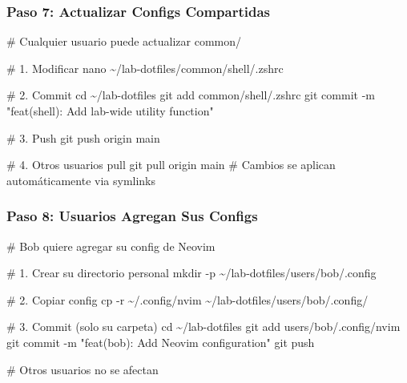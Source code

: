 \documentclass[
  doc,
  floatsintext,
  longtable,
  a4paper,
  nolmodern,
  notxfonts,
  notimes,
  12pt,
  colorlinks=true,linkcolor=blue,citecolor=blue,urlcolor=blue]{apa7}
\newenvironment{Shaded}{\begin{snugshade}}{\end{snugshade}}
\newcommand{\AttributeTok}[1]{\textcolor[rgb]{0.40,0.45,0.13}{#1}}
\newcommand{\BuiltInTok}[1]{\textcolor[rgb]{0.00,0.23,0.31}{#1}}
\newcommand{\CommentTok}[1]{\textcolor[rgb]{0.37,0.37,0.37}{#1}}
\newcommand{\FunctionTok}[1]{\textcolor[rgb]{0.28,0.35,0.67}{#1}}
\newcommand{\NormalTok}[1]{\textcolor[rgb]{0.00,0.23,0.31}{#1}}
\newcommand{\StringTok}[1]{\textcolor[rgb]{0.13,0.47,0.30}{#1}}
\begin{document}
\subsubsection{Paso 7: Actualizar Configs
Compartidas}\label{paso-7-actualizar-configs-compartidas}

\begin{Shaded}
\begin{Highlighting}[]
\CommentTok{\# Cualquier usuario puede actualizar common/}

\CommentTok{\# 1. Modificar}
\FunctionTok{nano}\NormalTok{ \textasciitilde{}/lab{-}dotfiles/common/shell/.zshrc}

\CommentTok{\# 2. Commit}
\BuiltInTok{cd}\NormalTok{ \textasciitilde{}/lab{-}dotfiles}
\FunctionTok{git}\NormalTok{ add common/shell/.zshrc}
\FunctionTok{git}\NormalTok{ commit }\AttributeTok{{-}m} \StringTok{"feat(shell): Add lab{-}wide utility function"}

\CommentTok{\# 3. Push}
\FunctionTok{git}\NormalTok{ push origin main}

\CommentTok{\# 4. Otros usuarios pull}
\FunctionTok{git}\NormalTok{ pull origin main}
\CommentTok{\# Cambios se aplican automáticamente via symlinks}
\end{Highlighting}
\end{Shaded}

\subsubsection{Paso 8: Usuarios Agregan Sus
Configs}\label{paso-8-usuarios-agregan-sus-configs}

\begin{Shaded}
\begin{Highlighting}[]
\CommentTok{\# Bob quiere agregar su config de Neovim}

\CommentTok{\# 1. Crear su directorio personal}
\FunctionTok{mkdir} \AttributeTok{{-}p}\NormalTok{ \textasciitilde{}/lab{-}dotfiles/users/bob/.config}

\CommentTok{\# 2. Copiar config}
\FunctionTok{cp} \AttributeTok{{-}r}\NormalTok{ \textasciitilde{}/.config/nvim \textasciitilde{}/lab{-}dotfiles/users/bob/.config/}

\CommentTok{\# 3. Commit (solo su carpeta)}
\BuiltInTok{cd}\NormalTok{ \textasciitilde{}/lab{-}dotfiles}
\FunctionTok{git}\NormalTok{ add users/bob/.config/nvim}
\FunctionTok{git}\NormalTok{ commit }\AttributeTok{{-}m} \StringTok{"feat(bob): Add Neovim configuration"}
\FunctionTok{git}\NormalTok{ push}

\CommentTok{\# Otros usuarios no se afectan}
\end{Highlighting}
\end{Shaded}
\end{document}
